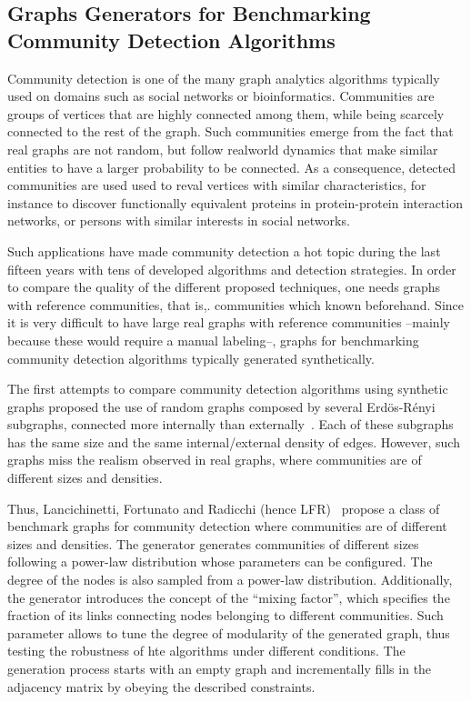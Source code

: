 \subsection{Graphs Generators for Benchmarking Community Detection Algorithms}
\label{sec:generators_community_detection}

Community detection is one of the many graph analytics algorithms typically used on domains such as social networks or bioinformatics. Communities are groups of vertices that are highly connected among them, while being scarcely connected to the rest of the graph. Such communities emerge from the fact that real graphs are not random, but follow realworld dynamics that make similar entities to have a larger probability to be connected. As a consequence, detected communities are used used to reval vertices with similar characteristics, for instance to discover functionally equivalent proteins in protein-protein interaction networks, or persons with similar interests in social networks. 

Such applications have made community detection a hot topic during the last fifteen years with tens of developed algorithms and detection strategies. In order to compare the quality of the different proposed techniques, one needs graphs with reference communities, that is,. communities which known beforehand. Since it is very difficult to have large real graphs with reference communities --mainly because these would require a manual labeling--, graphs for benchmarking community detection algorithms typically generated synthetically.

The first attempts to compare community detection algorithms using synthetic graphs proposed the use of random graphs composed by several Erd\"{o}s-R\'{e}nyi~\cite{Erdos:1960} subgraphs, connected more internally than externally~\cite{danon2005comparing}. Each of these subgraphs has the same size and the same internal/external density of edges. However, such graphs miss the realism observed in real graphs, where communities are of different sizes and densities. 

Thus, Lancichinetti, Fortunato and Radicchi (hence LFR)~\cite{PhysRevE.78.046110} propose a class of benchmark graphs for community detection where communities are of different sizes and densities. The generator generates communities of different sizes following a power-law distribution whose parameters can be configured. The degree of the nodes is also sampled from a power-law distribution. Additionally, the generator introduces the concept of the ``mixing factor'', which specifies the fraction of its links connecting nodes belonging to different communities. Such parameter allows to tune the degree of modularity of the generated graph, thus testing the robustness of hte algorithms under different conditions. The generation process starts with an empty graph and incrementally fills in the adjacency matrix by obeying the described constraints.


